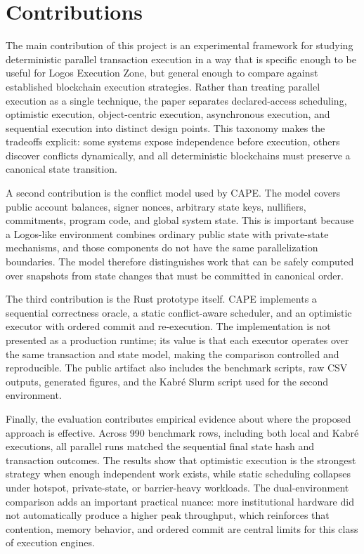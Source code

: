 \documentclass[runningheads]{llncs}
\begin{document}
\section{Contributions}

The main contribution of this project is an experimental framework for studying deterministic parallel transaction execution in a way that is specific enough to be useful for Logos Execution Zone, but general enough to compare against established blockchain execution strategies. Rather than treating parallel execution as a single technique, the paper separates declared-access scheduling, optimistic execution, object-centric execution, asynchronous execution, and sequential execution into distinct design points. This taxonomy makes the tradeoffs explicit: some systems expose independence before execution, others discover conflicts dynamically, and all deterministic blockchains must preserve a canonical state transition.

A second contribution is the conflict model used by CAPE. The model covers public account balances, signer nonces, arbitrary state keys, nullifiers, commitments, program code, and global system state. This is important because a Logos-like environment combines ordinary public state with private-state mechanisms, and those components do not have the same parallelization boundaries. The model therefore distinguishes work that can be safely computed over snapshots from state changes that must be committed in canonical order.

The third contribution is the Rust prototype itself. CAPE implements a sequential correctness oracle, a static conflict-aware scheduler, and an optimistic executor with ordered commit and re-execution. The implementation is not presented as a production runtime; its value is that each executor operates over the same transaction and state model, making the comparison controlled and reproducible. The public artifact also includes the benchmark scripts, raw CSV outputs, generated figures, and the Kabré Slurm script used for the second environment.

Finally, the evaluation contributes empirical evidence about where the proposed approach is effective. Across 990 benchmark rows, including both local and Kabré executions, all parallel runs matched the sequential final state hash and transaction outcomes. The results show that optimistic execution is the strongest strategy when enough independent work exists, while static scheduling collapses under hotspot, private-state, or barrier-heavy workloads. The dual-environment comparison adds an important practical nuance: more institutional hardware did not automatically produce a higher peak throughput, which reinforces that contention, memory behavior, and ordered commit are central limits for this class of execution engines.
\end{document}
